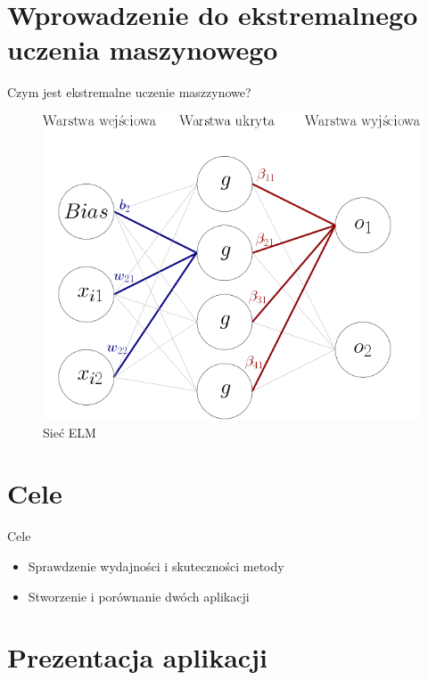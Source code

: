 \documentclass{beamer}
\begin{document}
\section{Wprowadzenie do ekstremalnego uczenia maszynowego}
\begin{frame}{Czym jest ekstremalne uczenie maszzynowe?}
\begin{figure}[H]
\includegraphics[scale=0.5]{schemat_sieci.png}
\caption{Sieć ELM}
\end{figure}
\end{frame}
\section{Cele}
\begin{frame}{Cele}
\begin{itemize}
\item Sprawdzenie wydajności i skuteczności metody
\item Stworzenie i porównanie dwóch aplikacji
\end{itemize}
\end{frame}
\section{Prezentacja aplikacji}
\end{document}
